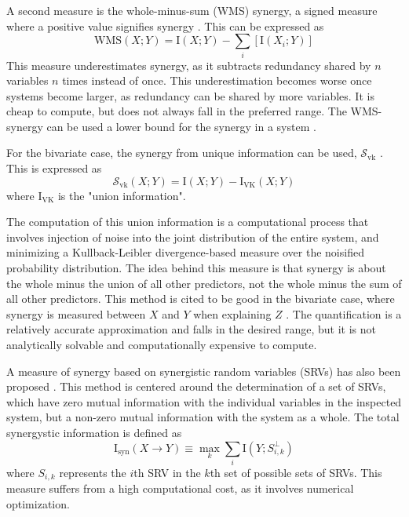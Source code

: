 \documentclass[../main.tex]{subfiles}
\begin{document}
A second measure is the whole-minus-sum (WMS) synergy, a signed measure where a positive value
signifies synergy \cite{gawne1993independent, griffith2014quantifying}.
This can be expressed as
%
\begin{equation}
\mathrm{WMS} \left( X;Y \right) = \mathrm{I} \left( X;Y \right) - \sum_i [\mathrm{I} \left( X_i;Y \right)]
\label{WMS}
\end{equation}
%
This measure underestimates synergy, as it subtracts redundancy shared by $n$ variables $n$ times instead of once.
This underestimation becomes worse once systems become larger, as redundancy can be shared by more variables.
It is cheap to compute, but does not always fall in the preferred range.
The WMS-synergy can be used a lower bound for the synergy in a system \cite{griffith2014quantifying, olbrich2015information}.

For the bivariate case, the synergy from unique information can be used, $\mathcal{S}_\mathrm{vk}$ \cite{bertschinger2014quantifying, griffith2014quantifying, olbrich2015information}.
This is expressed as
\begin{equation}
\mathcal{S}_\mathrm{vk} \left( X;Y \right) = \mathrm{I}\left( X;Y \right) - \mathrm{I}_\mathrm{VK} \left( X;Y \right)
\end{equation}
%
where $\mathrm{I}_\mathrm{VK}$ is the "union information".

The computation of this union information is a computational process that involves injection of noise into the joint distribution of the entire system, and minimizing a Kullback-Leibler divergence-based measure over the noisified probability distribution.
The idea behind this measure is that synergy is about the whole minus the union of all other predictors, not the whole minus the sum of all other predictors.
This method is cited to be good in the bivariate case, where synergy is measured between $X$ and $Y$ when explaining $Z$ \cite{olbrich2015information}.
The quantification is a relatively accurate approximation and falls in the desired range, but it is not analytically solvable and computationally expensive to compute.

A measure of synergy based on synergistic random variables (SRVs) has also been proposed \cite{quax2017quantifying}.
This method is centered around the determination of a set of SRVs, which have zero mutual information with the individual variables in the inspected system, but a non-zero mutual information with the system as a whole.
The total synergystic information is defined as
\begin{equation}
\label{SRV}
\mathrm{I}_\mathrm{syn}\left( X \rightarrow Y\right) \equiv \max_k \sum_i \mathrm{I}\left( Y ; S_{i,k}^\perp \right)
\end{equation}
where $S_{i,k}$ represents the $i$th SRV in the $k$th set of possible sets of SRVs.
This measure suffers from a high computational cost, as it involves numerical optimization.
\end{document}
